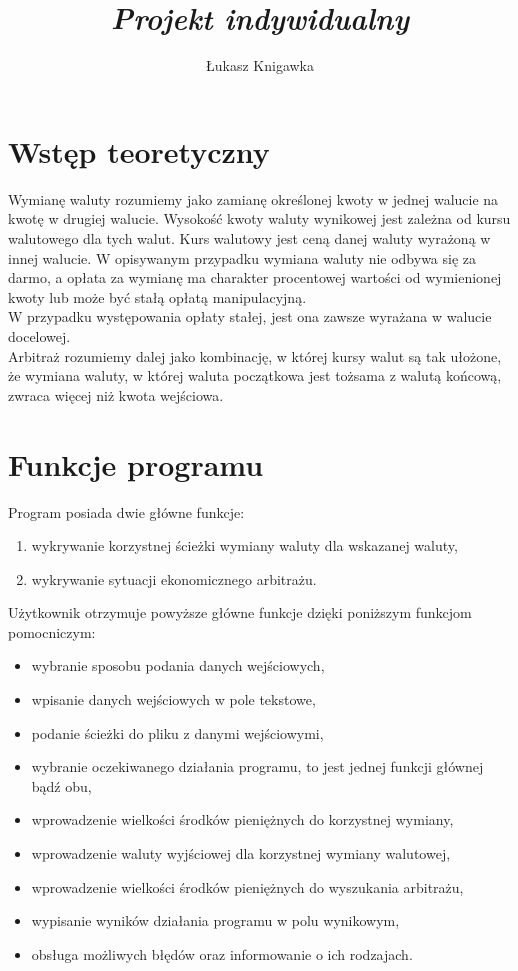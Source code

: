 \documentclass[a4paper,12pt]{article}
\title{ \sc{Specyfikacja funkcjonalna} \\
\emph{Projekt indywidualny} }
\author{Łukasz Knigawka}
\newcommand\tab[1][0.6cm]{\hspace*{#1} }
\begin{document}
\maketitle

\thispagestyle{empty}

\tableofcontents

\newpage

\section{Wstęp teoretyczny}

\tab Wymianę waluty rozumiemy jako zamianę określonej kwoty w jednej walucie na kwotę w drugiej walucie. Wysokość kwoty waluty wynikowej jest zależna od kursu walutowego dla tych walut. Kurs walutowy jest ceną danej waluty wyrażoną w innej walucie. W opisywanym przypadku wymiana waluty nie odbywa się za darmo, a opłata za wymianę ma charakter procentowej wartości od wymienionej kwoty lub może być stałą opłatą manipulacyjną. \\W przypadku występowania opłaty stałej, jest ona zawsze wyrażana w walucie docelowej.
\\\tab Arbitraż rozumiemy dalej jako kombinację, w której kursy walut są tak ułożone, że wymiana waluty, w której waluta początkowa jest tożsama z walutą końcową, zwraca więcej niż kwota wejściowa.

\section{Funkcje programu}

\tab Program posiada dwie główne funkcje:
\begin{enumerate}
\item wykrywanie korzystnej ścieżki wymiany waluty dla wskazanej waluty,
\item wykrywanie sytuacji ekonomicznego arbitrażu.
\end{enumerate}
\tab Użytkownik otrzymuje powyższe główne funkcje dzięki poniższym funkcjom pomocniczym:
\begin{itemize}
\item wybranie sposobu podania danych wejściowych,
\item wpisanie danych wejściowych w pole tekstowe,
\item podanie ścieżki do pliku z danymi wejściowymi,
\item wybranie oczekiwanego działania programu, to jest jednej funkcji głównej bądź obu,
\item wprowadzenie wielkości środków pieniężnych do korzystnej wymiany,
\item wprowadzenie waluty wyjściowej dla korzystnej wymiany walutowej,
\item wprowadzenie wielkości środków pieniężnych do wyszukania arbitrażu,
\item wypisanie wyników działania programu w polu wynikowym,
\item obsługa możliwych błędów oraz informowanie o ich rodzajach.
\end{itemize}
\end{document}
